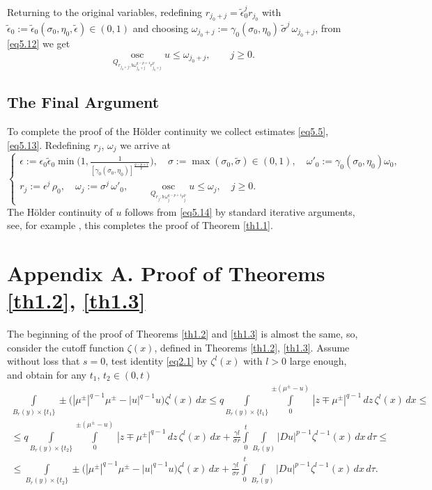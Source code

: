 \documentclass[a4paper,11pt,fullpage]{article}
\DeclareMathOperator*{\osc}{osc}
\numberwithin{equation}{section}
\begin{document}
Returning to the original variables, redefining $r_{j_0+j}=\tilde{\epsilon}^j_0 r_{j_0}$ with $\tilde{\epsilon}_0:=\tilde{\epsilon}_0(\sigma_0, \eta_0, \tilde{\epsilon})\in (0, 1)$ and choosing $\omega_{j_0+j}:=\gamma_0(\sigma_0, \eta_0)\,\tilde{\sigma}^j\,\omega_{j_0+j}$, from \eqref{eq5.12} we get
\begin{equation}\label{eq5.13}
\osc\limits_{Q_{r_{j_0+j}, b\omega^{q-p+1}_{j_0+j} r^p_{j_0+j}}} u\leqslant \omega_{j_0+j},\qquad j\geqslant 0.
\end{equation}

\subsection{The Final Argument}
To complete the proof of the H\"{o}lder continuity we collect estimates \eqref{eq5.5}, \eqref{eq5.13}. Redefining $r_j$, $\omega_j$
we arrive at 
\begin{equation}\label{eq5.14}
\begin{cases}
\epsilon:=\epsilon_0 \tilde{\epsilon}_0 \min\big(1, \frac{1}{[\gamma_0(\sigma_0, \eta_0)]^{\frac{q-p+1}{p}}}\big),\quad \sigma:=\max(\sigma_0, \tilde{\sigma})\in (0, 1),\quad \omega'_0:=\gamma_0(\sigma_0, \eta_0)\omega_0,\\
r_j:=\epsilon^j\,\rho_0,\quad\omega_j:=\sigma^j\,\omega'_0,\qquad
\osc\limits_{Q_{r_j, b \,\omega_j^{q-p+1} r^p_j}} u\leqslant \omega_j,\quad j\geqslant 0.
\end{cases}
\end{equation}
The H\"{o}lder continuity of $u$ follows from \eqref{eq5.14}
by standard iterative arguments, see, for example \cite[Chapter 3]{DiB1}, this completes the proof of
Theorem \ref{th1.1}.




\section{Appendix A. Proof of Theorems \ref{th1.2}, \ref{th1.3}}

The beginning of the proof of Theorems \ref{th1.2} and \ref{th1.3} is almost the same, so,  consider the cutoff function $\zeta(x)$, defined 
in Theorems \ref{th1.2}, \ref{th1.3}. Assume without loss that $s=0$, test identity \eqref{eq2.1} by $\zeta^l(x)$ with $l>0$ large enough,
and obtain for any $t_1$, $t_2\in (0, t)$
\begin{multline}\label{eq6.1}
\int\limits_{B_{r}(y)\times\{t_1\}}\pm\big(|\mu^{\pm}|^{q-1}\mu^{\pm}-|u|^{q-1}u\big)\zeta^l(x)\,dx\leqslant
q\int\limits_{B_{r}(y)\times\{t_1\}}\int\limits^{\pm(\mu^{\pm}-u)}_0\,|z\mp \mu^{\pm}|^{q-1}\,dz\,\zeta^l(x)\,dx\leqslant\\\leqslant
q\int\limits_{B_{r}(y)\times\{t_2\}}\int\limits^{\pm(\mu^{\pm}-u)}_0\,|z\mp \mu^{\pm}|^{q-1}\,dz\,\zeta^l(x)\,dx+
\frac{\gamma l}{\sigma r}\int\limits^t_0\int\limits_{B_{r}(y)}|D u|^{p-1} \zeta^{l-1}(x)\,dx\,d\tau\leqslant\\\leqslant\int\limits_{B_{r}(y)\times\{t_2\}}\pm\big(|\mu^{\pm}|^{q-1}\mu^{\pm}-|u|^{q-1}u\big)\zeta^l(x)\,dx+
\frac{\gamma l}{\sigma r}\int\limits^t_0\int\limits_{B_{r}(y)}|D u|^{p-1} \zeta^{l-1}(x)\,dx\,d\tau.
\end{multline}
\end{document}
